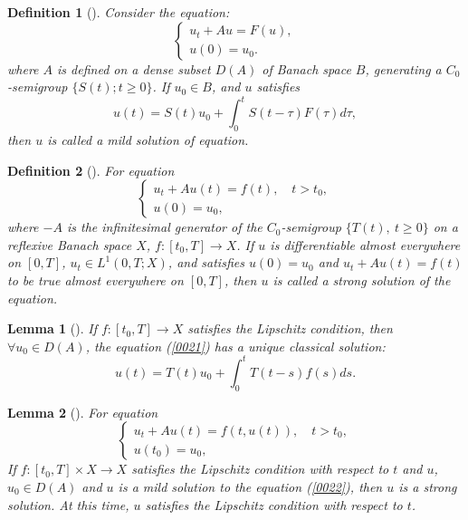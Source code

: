 \documentclass{article}
\numberwithin{equation}{section}
\newtheorem{lemma}{Lemma}[section]
\newtheorem{definition}{Definition}[section]
\begin{document}
\begin{definition}[\cite{are}]
    Consider the equation:
    \begin{equation*}
    \left\{\begin{array}{l}
    u_t+A u=F(u), \\
    u(0)=u_{0}.
    \end{array}\right.
    \label{mild}
    \end{equation*}
    where $A$ is defined on a dense subset $D(A)$ of Banach space $B$, generating a $C_0$-semigroup $\{S(t) ; t \geq 0\}$. If  $u_0\in B$, and $u$ satisfies
    $$ u(t)=S(t) u_{0}+\int_{0}^{t} S(t-\tau) F(\tau) d \tau ,$$
    then $u$ is called a mild solution of equation.
    \end{definition}

\begin{definition}[\cite{ref18}]
    For equation
    \begin{equation}
        \left\{\begin{array}{l}u_t+A u(t)=f(t), \quad t>t_{0} , \\ u\left(0\right)=u_{0},
    \end{array}\right.\label{0021}
    \end{equation}
    where $-A$ is the infinitesimal generator of the $C_0$-semigroup $\{ T(t),\ t \geq 0\}$ on a reflexive Banach space $X$, $f:\left[t_{0}, T\right]  \rightarrow X $. If $u$ is differentiable almost everywhere on $[0,T]$, $u_t\in L^1(0,T;X)$, and satisfies $u\left(0\right)=u_{0}$ and $u_t+A u(t)=f(t)$ to be true almost everywhere on $[0,T]$, then $u$ is called a strong solution of the equation.
\end{definition}

\begin{lemma}[\cite{ref18}]\label{classic exists}
    If $f:\left[t_{0}, T\right]  \rightarrow X $ satisfies the Lipschitz condition, then $ \forall u_0\in D(A) $, the equation (\ref{0021}) has a unique classical solution:
   \begin{equation*}
       u(t)=T(t) u_0+\int_{0}^{t} T(t-s) f(s) ds.
   \end{equation*}
\end{lemma}

\begin{lemma}[\cite{ref18}]\label{strong exists}
    For equation
    \begin{equation}
	\left\{\begin{array}{l}u_t+A u(t)=f(t, u(t)), \quad t>t_{0},  \\ u\left(t_{0}\right)=u_{0},\end{array}\right.\label{0022}
    \end{equation}
    If $f:\left[t_{0}, T\right] \times X \rightarrow X $ satisfies the Lipschitz condition with respect to $t$ and $u$, $u_{0} \in D(A)$ and $u$ is a mild solution to the equation (\ref{0022}), then $u$ is a strong solution. At this time, $u$ satisfies the Lipschitz condition with respect to $t$.
\end{lemma}
\end{document}
